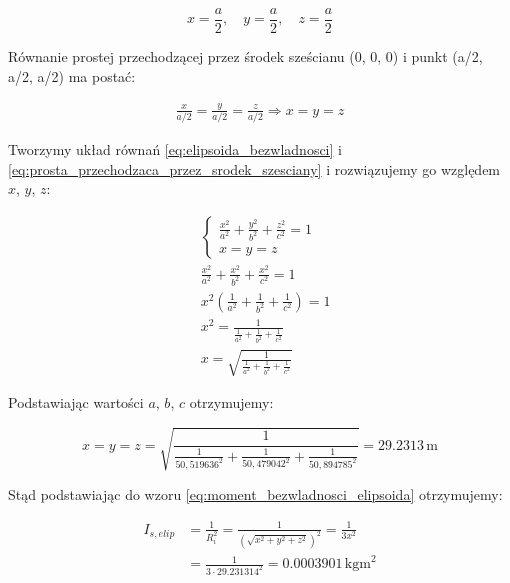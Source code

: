 \documentclass[a4paper,12pt]{article}
\begin{document}
\begin{equation*}
    x = \frac{a}{2}, \quad
    y = \frac{a}{2}, \quad
    z = \frac{a}{2}
\end{equation*}

Równanie prostej przechodzącej przez środek sześcianu (0, 0, 0) i punkt (a/2, a/2, a/2) ma postać:

\begin{align} \label{eq:prosta_przechodzaca_przez_srodek_szesciany}
    \frac{x}{a/2} = \frac{y}{a/2} = \frac{z}{a/2}
    \Rightarrow
    x = y = z
\end{align}

Tworzymy układ równań \eqref{eq:elipsoida_bezwladnosci} i \eqref{eq:prosta_przechodzaca_przez_srodek_szesciany} i rozwiązujemy go względem $x$, $y$, $z$:

\begin{align*} \label{eq:rozwiazanie_ukladu_rownan}
     & \begin{cases}
           \frac{x^2}{a^2} + \frac{y^2}{b^2} + \frac{z^2}{c^2}  = 1 \\
           x = y = z
       \end{cases} \\
     & \frac{x^2}{a^2} + \frac{x^2}{b^2} + \frac{x^2}{c^2} = 1              \\
     & x^2 \left( \frac{1}{a^2} + \frac{1}{b^2} + \frac{1}{c^2} \right) = 1 \\
     & x^2 = \frac{1}{\frac{1}{a^2} + \frac{1}{b^2} + \frac{1}{c^2}}        \\
     & x = \sqrt{\frac{1}{\frac{1}{a^2} + \frac{1}{b^2} + \frac{1}{c^2}}}
\end{align*}

Podstawiając wartości $a$, $b$, $c$ otrzymujemy:

\begin{equation*}
    x = y = z = \sqrt{\frac{1}{\frac{1}{50,519636^2} + \frac{1}{50,479042^2} + \frac{1}{50,894785^2}}} = 29.2313\,\text{m}
\end{equation*}

Stąd podstawiając do wzoru \eqref{eq:moment_bezwladnosci_elipsoida} otrzymujemy:

\begin{align*}
    I_{s, elip} & = \frac{1}{R_i^2} = \frac{1}{(\sqrt{x^2 + y^2 + z^2})^2}  = \frac{1}{3x^2} \\
                & = \frac{1}{ 3 \cdot 29.231314^2} = 0.0003901\,\text{kgm}^2
\end{align*}
\end{document}
